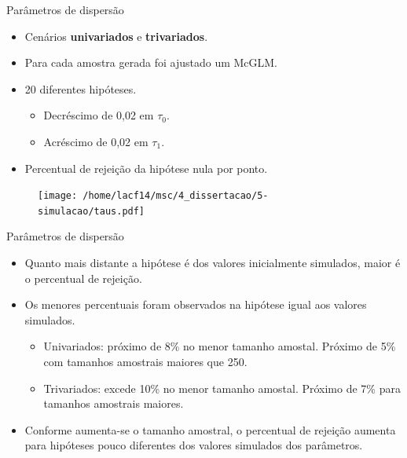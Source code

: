 \documentclass[
  ignorenonframetext,
  serif,
  professionalfont,
  usenames,
  dvipsnames,
  aspectratio = 169]{beamer}
\begin{document}
\begin{frame}{Parâmetros de dispersão}
\protect\hypertarget{paruxe2metros-de-dispersuxe3o-1}{}
\begin{itemize}
  \itemsep 2ex
    \item Cenários \textbf{univariados} e \textbf{trivariados}.
    \item Para cada amostra gerada foi ajustado um McGLM.
  \item 20 diferentes hipóteses. 
    \begin{itemize}
      \item Decréscimo de 0,02 em $\tau_0$.
      \item Acréscimo de 0,02 em $\tau_1$.
    \end{itemize}

  \item Percentual de rejeição da hipótese nula por ponto. 

\end{itemize}
\end{frame}

\begin{frame}{}
\protect\hypertarget{section-1}{}
\begin{figure}[H]
\centering
\texttt{[image: /home/lacf14/msc/4\_dissertacao/5-simulacao/taus.pdf]}
\end{figure}
\end{frame}

\begin{frame}{Parâmetros de dispersão}
\protect\hypertarget{paruxe2metros-de-dispersuxe3o-2}{}
\begin{itemize}
  \itemsep 2ex
  
  \item Quanto mais distante a hipótese é dos valores inicialmente simulados, maior é o percentual de rejeição. 
  
  \item Os menores percentuais foram observados na hipótese igual aos valores simulados. 
    \begin{itemize}
      \item Univariados: próximo de 8\% no menor tamanho amostal. Próximo de 5\% com tamanhos amostrais maiores que 250. 
      \item Trivariados: excede 10\% no menor tamanho amostal. Próximo de 7\% para tamanhos amostrais maiores.
    \end{itemize}

  \item Conforme aumenta-se o tamanho amostral, o percentual de rejeição aumenta para hipóteses pouco diferentes dos valores simulados dos parâmetros.

\end{itemize}
\end{frame}
\end{document}

